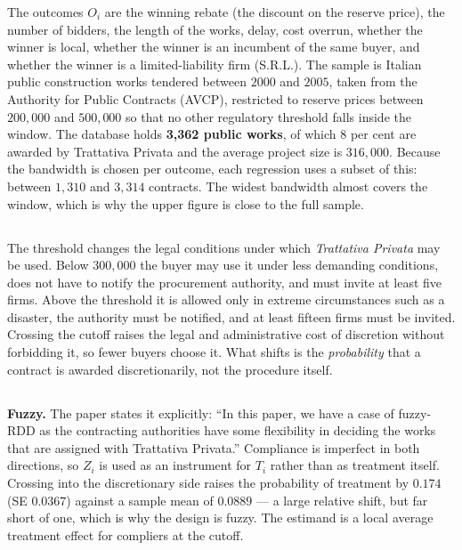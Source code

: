 \documentclass[11pt]{article}
\begin{document}
The outcomes $O_i$ are the winning rebate (the discount on the reserve price),
the number of bidders, the length of the works, delay, cost overrun, whether
the winner is local, whether the winner is an incumbent of the same buyer, and
whether the winner is a limited-liability firm (S.R.L.). The sample is Italian
public construction works tendered between $2000$ and $2005$, taken from the
Authority for Public Contracts (AVCP), restricted to reserve prices between
\texteuro$200{,}000$ and \texteuro$500{,}000$ so that no other regulatory
threshold falls inside the window. The database holds \textbf{3,362 public
works}, of which $8$ per cent are awarded by Trattativa Privata and the average
project size is \texteuro$316{,}000$. Because the bandwidth is chosen per
outcome, each regression uses a subset of this: between $1{,}310$ and $3{,}314$
contracts. The widest bandwidth almost covers the window, which is why the
upper figure is close to the full sample.

\subsection{}
The threshold changes the legal conditions under which \emph{Trattativa
Privata} may be used. Below \texteuro$300{,}000$ the buyer may use it under
less demanding conditions, does not have to notify the procurement authority,
and must invite at least five firms. Above the threshold it is allowed only in
extreme circumstances such as a disaster, the authority must be notified, and
at least fifteen firms must be invited. Crossing the cutoff raises the legal
and administrative cost of discretion without forbidding it, so fewer buyers
choose it. What shifts is the \emph{probability} that a contract is awarded
discretionarily, not the procedure itself.

\subsection{}
\textbf{Fuzzy.} The paper states it explicitly: ``In this paper, we have a case
of fuzzy-RDD as the contracting authorities have some flexibility in deciding
the works that are assigned with Trattativa Privata.'' Compliance is imperfect
in both directions, so $Z_i$ is used as an instrument for $T_i$ rather than as
treatment itself. Crossing into the discretionary side raises the probability
of treatment by $0.174$ (SE $0.0367$) against a sample mean of $0.0889$ --- a
large relative shift, but far short of one, which is why the design is fuzzy.
The estimand is a local average treatment effect for compliers at the cutoff.
\end{document}
